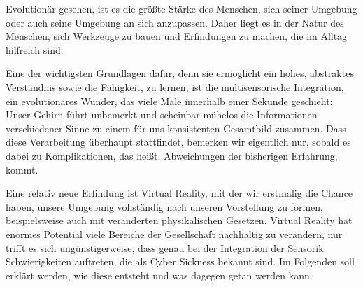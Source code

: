 Evolution\"ar gesehen, ist es die gr\"o{\ss}te St\"arke des Menschen, sich seiner Umgebung oder auch seine Umgebung an sich anzupassen. Daher liegt es in der Natur des Menschen, sich Werkzeuge zu bauen und Erfindungen zu machen, die im Alltag hilfreich sind.

Eine der wichtigsten Grundlagen daf\"ur, denn sie erm\"oglicht ein hohes, abstraktes Verst\"andnis sowie die F\"ahigkeit, zu lernen, ist die multisensorische Integration, ein evolution\"ares Wunder, das viele Male innerhalb einer Sekunde geschieht: Unser Gehirn f\"uhrt unbemerkt und scheinbar m\"uhelos die Informationen verschiedener Sinne zu einem f\"ur uns konsistenten Gesamtbild zusammen.
Dass diese Verarbeitung \"uberhaupt stattfindet, bemerken wir eigentlich nur, sobald es dabei zu Komplikationen, das hei{\ss}t, Abweichungen der bisherigen Erfahrung, kommt. 

Eine relativ neue Erfindung ist Virtual Reality, mit der wir erstmalig die Chance haben, unsere Umgebung vollst\"andig nach unseren Vorstellung zu formen, beispielsweise auch mit ver\"anderten physikalischen Gesetzen.
Virtual Reality hat enormes Potential viele Bereiche der Gesellschaft nachhaltig zu ver\"andern, nur trifft es sich ung\"unstigerweise, dass genau bei der Integration der Sensorik Schwierigkeiten auftreten, die als Cyber Sickness bekannt sind. Im Folgenden soll erkl\"art werden, wie diese entsteht und was dagegen getan werden kann.